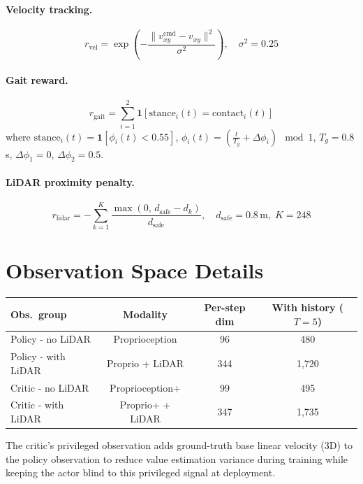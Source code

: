 \documentclass{article}
\begin{document}
\paragraph{Velocity tracking.}
\[
  r_\text{vel} = \exp\!\left(-\frac{\|v_{xy}^\text{cmd} - v_{xy}\|^2}{\sigma^2}\right),
  \quad \sigma^2 = 0.25
\]

\paragraph{Gait reward.}
\[
  r_\text{gait} = \sum_{i=1}^{2} \mathbf{1}\!\left[\text{stance}_i(t) = \text{contact}_i(t)\right]
\]
where $\text{stance}_i(t) = \mathbf{1}[\phi_i(t) < 0.55]$,
$\phi_i(t) = \left(\frac{t}{T_g} + \Delta\phi_i\right) \!\mod 1$,
$T_g = 0.8$\,s, $\Delta\phi_1 = 0$, $\Delta\phi_2 = 0.5$.

\paragraph{LiDAR proximity penalty.}
\[
  r_\text{lidar} = -\sum_{k=1}^{K} \frac{\max(0,\, d_\text{safe} - d_k)}{d_\text{safe}},
  \quad d_\text{safe} = 0.8\,\text{m},\; K = 248
\]

\section{Observation Space Details}
\label{app:obs}

\begin{center}
\begin{tabular}{lccc}
  \toprule
  \textbf{Obs.\ group} & \textbf{Modality} & \textbf{Per-step dim}
    & \textbf{With history ($T{=}5$)} \\
  \midrule
  Policy - no LiDAR & Proprioception & 96 & 480 \\
  Policy - with LiDAR & Proprio + LiDAR & 344 & 1{,}720 \\
  Critic - no LiDAR & Proprioception+ & 99 & 495 \\
  Critic - with LiDAR & Proprio+ + LiDAR & 347 & 1{,}735 \\
  \bottomrule
\end{tabular}
\end{center}

The critic's privileged observation adds ground-truth base linear velocity (3D)
to the policy observation to reduce value estimation variance during training
while keeping the actor blind to this privileged signal at deployment.
\end{document}
